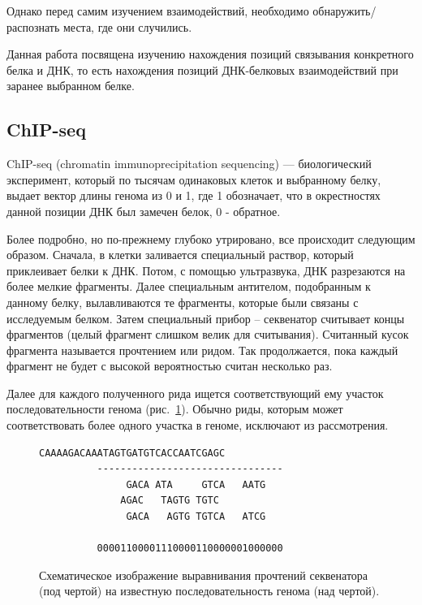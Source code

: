 \documentclass{matmex-diploma-custom}
\begin{document}
Однако перед самим изучением взаимодействий, необходимо обнаружить/распознать места, где они случились.

Данная работа посвящена изучению нахождения позиций связывания конкретного белка и ДНК, то есть нахождения позиций ДНК-белковых взаимодействий при заранее выбранном белке.

\subsection*{ChIP-seq}
ChIP-seq (chromatin immunoprecipitation sequencing) --- биологический эксперимент, который по тысячам одинаковых клеток и выбранному белку, выдает вектор длины генома из 0 и 1, где 1 обозначает, что в окрестностях данной позиции ДНК был замечен белок, 0 - обратное.

Более подробно, но по-прежнему глубоко утрировано, все происходит следующим образом. Сначала, в клетки заливается специальный раствор, который приклеивает белки к ДНК. Потом, с помощью ультразвука, ДНК разрезаются на более мелкие фрагменты. Далее специальным антителом, подобранным к данному белку, вылавливаются те фрагменты, которые были связаны с исследуемым белком. Затем специальный прибор -- секвенатор считывает концы фрагментов (целый фрагмент слишком велик для считывания). Считанный кусок фрагмента называется прочтением или ридом. 
Так продолжается, пока каждый фрагмент не будет с высокой вероятностью считан несколько раз.

Далее для каждого полученного рида ищется соответствующий
ему участок последовательности генома (рис.~\ref{fig:chip-seq}). Обычно
риды, которым может соответствовать более одного участка в геноме,
исключают из рассмотрения.

\begin{figure}[h]
  \centering

\begin{Verbatim}[commandchars=\\\{\}]
          CAAAAGACAAATAGTGATGTCACCAATCGAGC
          --------------------------------
               GACA ATA     GTCA   AATG
              AGAC   TAGTG TGTC
               GACA   AGTG TGTCA   ATCG

          00001100001110000110000001000000
\end{Verbatim}
  \caption{Схематическое изображение выравнивания прочтений секвенатора (под чертой)
    на известную последовательность генома (над чертой).}
  \label{fig:chip-seq}
\end{figure}
\end{document}
